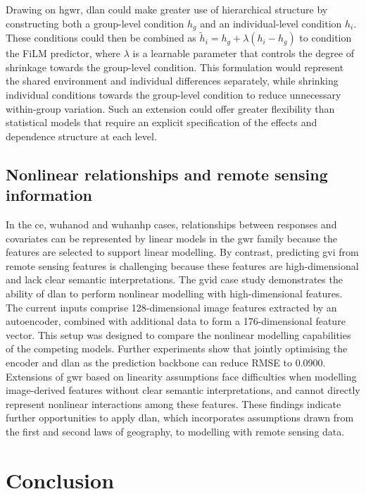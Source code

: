 \documentclass[]{interact}
\newcommand{\DLAN}{\gls{dlan}\xspace}
\newcommand{\COO}{\gls{ce}\xspace}
\newcommand{\WuhanOD}{\gls{wuhanod}\xspace}
\newcommand{\WuhanHP}{\gls{wuhanhp}\xspace}
\newcommand{\GVI}{\gls{gvid}\xspace}
\begin{document}
Drawing on \gls{hgwr}, \DLAN could make greater use of hierarchical structure
by constructing both a group-level condition $h_g$ and an individual-level condition $h_i$.
These conditions could then be combined as $\tilde{h}_i=h_g+\lambda(h_i-h_g)$ to condition the FiLM predictor, where $\lambda$ is a learnable parameter that controls the degree of shrinkage towards the group-level condition.
This formulation would represent the shared environment and individual differences separately,
while shrinking individual conditions towards the group-level condition to reduce unnecessary within-group variation.
Such an extension could offer greater flexibility than statistical models that require an explicit specification of the effects and dependence structure at each level.

\subsection{Nonlinear relationships and remote sensing information}

In the \COO, \WuhanOD and \WuhanHP cases, relationships between responses and covariates can be represented by linear models in the \gls{gwr} family because the features are selected to support linear modelling.
By contrast, predicting \gls{gvi} from remote sensing features is challenging because these features are high-dimensional and lack clear semantic interpretations.
The \GVI case study demonstrates the ability of \DLAN to perform nonlinear modelling with high-dimensional features.
The current inputs comprise 128-dimensional image features extracted by an autoencoder,
combined with additional data to form a 176-dimensional feature vector.
This setup was designed to compare the nonlinear modelling capabilities of the competing models.
Further experiments show that jointly optimising the encoder and \DLAN as the prediction backbone
can reduce RMSE to 0.0900.
Extensions of \gls{gwr} based on linearity assumptions face difficulties when modelling image-derived features without clear semantic interpretations,
and cannot directly represent nonlinear interactions among these features.
These findings indicate further opportunities to apply \DLAN,
which incorporates assumptions drawn from the first and second laws of geography,
to modelling with remote sensing data.

\section{Conclusion}\label{sec:conclusion}
\end{document}
